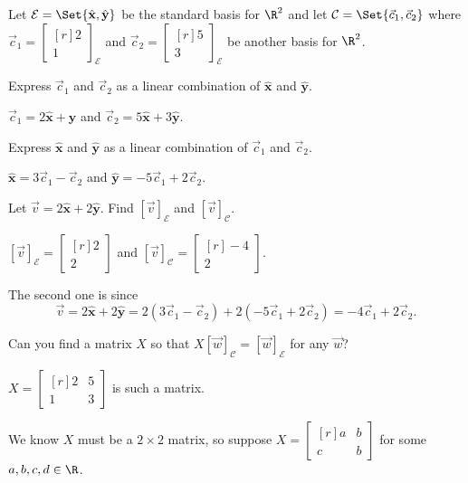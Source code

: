 \documentclass{problemset}
\newcommand{\xhat}{{\hat {\mathbf x}}}
\newcommand{\yhat}{{\hat {\mathbf y}}}
\newcommand{\mat}[1]{\begin{bmatrix*}[r]#1\end{bmatrix*}}
\begin{document}
	\question
	Let $\mathcal E=\Set{\xhat,\yhat}$ be the standard basis for $\R^2$ and 
	let $\mathcal C=\Set{\vec c_1,\vec c_2}$ where $\vec c_1=\mat{2\\1}_{\mathcal E}$
	and $\vec c_2=\mat{5\\3}_{\mathcal E}$ be another basis for $\R^2$.
	\begin{parts}
		\item Express $\vec c_1$ and $\vec c_2$ as a linear combination of $\xhat$ and $\yhat$.
			\begin{solution}[inline]
				$\vec c_1=2\xhat+\yhat$ and $\vec c_2=5\xhat+3\yhat$.
			\end{solution}
		\item Express $\xhat$ and $\yhat$ as a linear combination of $\vec c_1$ and $\vec c_2$.
			\begin{solution}[inline]
				$\xhat=3\vec c_1-\vec c_2$ and $\yhat=-5\vec c_1+2\vec c_2$.
			\end{solution}
		\item Let $\vec v=2\xhat+2\yhat$. Find $[\vec v]_{\mathcal E}$ and $[\vec v]_{\mathcal C}$.
			\begin{solution}
				$[\vec v]_{\mathcal E} = \mat{2\\2}$ and 
				$[\vec v]_{\mathcal C} = \mat{-4\\2}$.

				The second one is since
				\[
					\vec v=2\xhat+2\yhat
					=2(3\vec c_1-\vec c_2)+2(-5\vec c_1+2\vec c_2)
					=-4\vec c_1+2\vec c_2.
				\]
			\end{solution}
		\item Can you find a matrix $X$ so that $X[\vec w]_{\mathcal C} = [\vec w]_{\mathcal E}$
			for any	$\vec w$?
			\begin{solution}
				$X = \mat{2&5\\1&3}$ is such a matrix.

				We know $X$ must be a $2\times2$ matrix, so suppose $X=\mat{a&b\\c&b}$
				for some $a,b,c,d\in\R$. 


\end{solution}
\end{parts}
\end{document}
